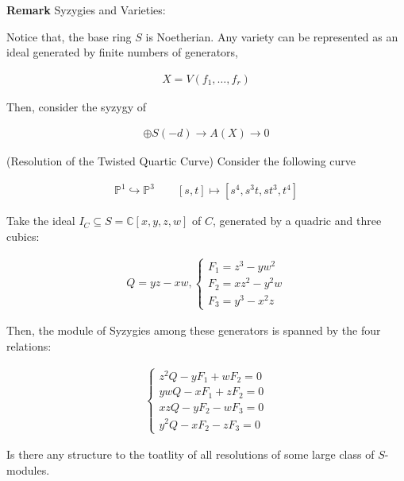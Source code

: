 \documentclass[Total.tex]{subfiles}
\begin{document}
			\textbf{Remark} Syzygies and Varieties:
			
			Notice that, the base ring $S$ is Noetherian. Any variety can be represented as an ideal generated by finite numbers of generators,
			
			\begin{gather*}
				X=V(f_1,\dots,f_r)
			\end{gather*}
			
			Then, consider the syzygy of 
			
			\begin{gather*}
				\oplus S(-d) \rightarrow A(X)\rightarrow 0
			\end{gather*}
			
			
			\begin{example}
				(Resolution of the Twisted Quartic Curve) Consider the following curve
				
				\begin{gather*}
					\mathbb{P}^1\hookrightarrow \mathbb{P}^3\qquad [s,t]\mapsto [s^4,s^3t,st^3,t^4]
				\end{gather*}
				
				Take the ideal $I_C\subseteq S=\mathbb{C}[x,y,z,w]$ of $C$, generated by a quadric and three cubics:
				
				\begin{gather*}
					Q=yz-xw,\begin{cases}
						F_1=z^3-yw^2\\
						F_2=xz^2-y^2w\\
						F_3=y^3-x^2z
					\end{cases}
				\end{gather*}
				
				Then, the module of Syzygies among these generators is spanned by the four relations:
				
				\begin{gather*}
					\begin{cases}
						z^2Q-yF_1+wF_2=0\\
						ywQ-xF_1+zF_2=0\\
						xzQ-yF_2-wF_3=0\\
						y^2Q-xF_2-zF_3=0
					\end{cases}
				\end{gather*}
			\end{example}
			
			\begin{prob}
				Is there any structure to the toatlity of all resolutions of some large class of $S$-modules.
			\end{prob}
			
\end{document}
